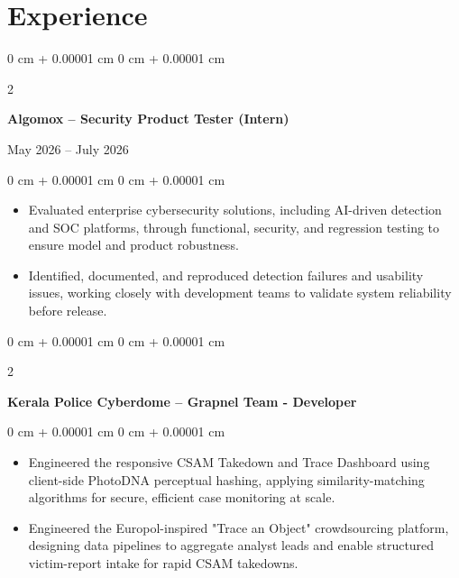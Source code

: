 \documentclass[10pt, a4paper]{article}
\newenvironment{highlights}{
    \begin{itemize}[
        topsep=0.10 cm,
        parsep=0.10 cm,
        partopsep=0pt,
        itemsep=0pt,
        leftmargin=0 cm + 10pt
    ]
}{
    \end{itemize}
} %
\newenvironment{onecolentry}{
    \begin{adjustwidth}{
        0 cm + 0.00001 cm
    }{
        0 cm + 0.00001 cm
    }
}{
    \end{adjustwidth}
} %
\newenvironment{twocolentry}[2][]{
    \onecolentry
    \def\secondColumn{#2}
    \setcolumnwidth{\fill, 4.5 cm}
    \begin{paracol}{2}
}{
    \switchcolumn \raggedleft \secondColumn
    \end{paracol}
    \endonecolentry
} %
\begin{document}
    \section{Experience}

    \vspace{0.2 cm}

    \begin{twocolentry}{
        May 2026 – July 2026
    }
        \textbf{Algomox – Security Product Tester (Intern)}
    \end{twocolentry}
    
    \vspace{0.10 cm}
    \begin{onecolentry}
        \begin{highlights}
            \item Evaluated enterprise cybersecurity solutions, including AI-driven detection and SOC platforms, through functional, security, and regression testing to ensure model and product robustness.
            \item Identified, documented, and reproduced detection failures and usability issues, working closely with development teams to validate system reliability before release.
        \end{highlights}
    \end{onecolentry}
    
    \vspace{0.2 cm}
    
    \begin{twocolentry}{
    }
        \textbf{Kerala Police Cyberdome – Grapnel Team - Developer}
    \end{twocolentry}
    
    \vspace{0.10 cm}
    \begin{onecolentry}
        \begin{highlights}
            \item Engineered the responsive CSAM Takedown and Trace Dashboard using client-side PhotoDNA perceptual hashing, applying similarity-matching algorithms for secure, efficient case monitoring at scale.
            \item Engineered the Europol-inspired "Trace an Object" crowdsourcing platform, designing data pipelines to aggregate analyst leads and enable structured victim-report intake for rapid CSAM takedowns.
        \end{highlights}
    \end{onecolentry}
    
\end{document}
